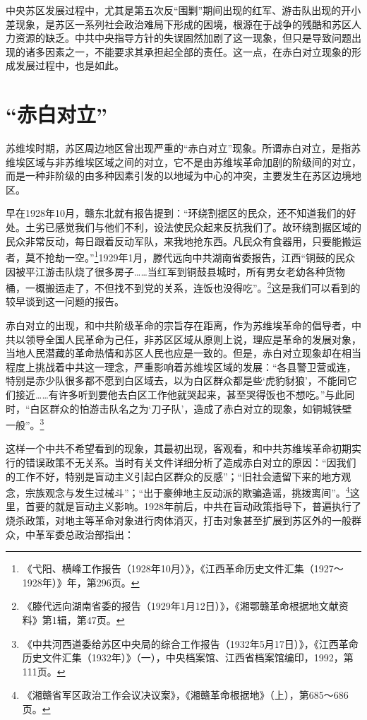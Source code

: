 中央苏区发展过程中，尤其是第五次反“围剿”期间出现的红军、游击队出现的开小差现象，是苏区一系列社会政治难局下形成的困境，根源在于战争的残酷和苏区人力资源的缺乏。中共中央指导方针的失误固然加剧了这一现象，但只是导致问题出现的诸多因素之一，不能要求其承担起全部的责任。这一点，在赤白对立现象的形成发展过程中，也是如此。

\section{“赤白对立”}


苏维埃时期，苏区周边地区曾出现严重的“赤白对立”现象。所谓赤白对立，是指苏维埃区域与非苏维埃区域之间的对立，它不是由苏维埃革命加剧的阶级间的对立，而是一种非阶级的由多种因素引发的以地域为中心的冲突，主要发生在苏区边境地区。


早在1928年10月，赣东北就有报告提到：“环绕割据区的民众，还不知道我们的好处。土劣已感觉我们与他们不利，设法使民众起来反抗我们了。故环绕割据区域的民众非常反动，每日跟着反动军队，来我地抢东西。凡民众有食器用，只要能搬运者，莫不抢劫一空。”\footnote{《弋阳、横峰工作报告（1928年10月）》，《江西革命历史文件汇集（1927～1928年）》年，第296页。}1929年1月，滕代远向中共湖南省委报告，江西“铜鼓的民众因被平江游击队烧了很多房子……当红军到铜鼓县城时，所有男女老幼各种货物桶，一概搬运走了，不但找不到党的关系，连饭也没得吃”。\footnote{《滕代远向湖南省委的报告（1929年1月12日）》，《湘鄂赣革命根据地文献资料》第1辑，第47页。}这是我们可以看到的较早谈到这一问题的报告。


赤白对立的出现，和中共阶级革命的宗旨存在距离，作为苏维埃革命的倡导者，中共以领导全国人民革命为己任，非苏区区域从原则上说，理应是革命的发展对象，当地人民潜藏的革命热情和苏区人民也应是一致的。但是，赤白对立现象却在相当程度上挑战着中共这一理念，严重影响着苏维埃区域的发展：“各县警卫营或连，特别是赤少队很多都不愿到白区域去，以为白区群众都是些‘虎豹豺狼’，不能同它们接近……有许多听到要他去白区工作他就哭起来，甚至哭得饭也不想吃。”与此同时，“白区群众的怕游击队名之为‘刀子队’，造成了赤白对立的现象，如铜城铁壁一般”。\footnote{《中共河西道委给苏区中央局的综合工作报告（1932年5月17日）》，《江西革命历史文件汇集（1932年）》（一），中央档案馆、江西省档案馆编印，1992，第111页。}


这样一个中共不希望看到的现象，其最初出现，客观看，和中共苏维埃革命初期实行的错误政策不无关系。当时有关文件详细分析了造成赤白对立的原因：“因我们的工作不好，特别是盲动主义引起白区群众的反感”；“旧社会遗留下来的地方观念，宗族观念与发生过械斗”；“出于豪绅地主反动派的欺骗造谣，挑拨离间”。\footnote{《湘赣省军区政治工作会议决议案》，《湘赣革命根据地》（上），第685～686页。}这里，首要的就是盲动主义影响。1928年前后，中共在盲动政策指导下，普遍执行了烧杀政策，对地主等革命对象进行肉体消灭，打击对象甚至扩展到苏区外的一般群众，中革军委总政治部指出：

